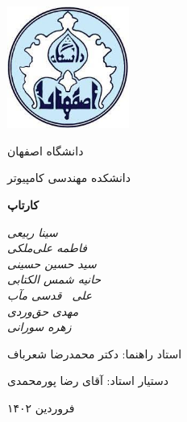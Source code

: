 \documentclass[12pt, oneside]{book}
\begin{document}
    \begin{titlepage}
    	\centering
    	\includegraphics[width=4cm, height=4cm]{logo}\par
        \vspace{2mm}
    	دانشگاه اصفهان \par
        دانشکده مهندسی کامپیوتر \par

    	\vspace{1cm}
    	{\huge \textbf{کارتاپ}\par}
    	\vspace{3cm}
    	{\small\itshape
        سینا ربیعی \\
    	فاطمه علی‌ملکی \\
    	سید حسین حسینی \\
    	حانیه شمس الکتابی \\
    	علی 
    	$\ $
    	قدسی مآب \\
    	مهدی حق‌وردی \\
    	زهره سورانی \par}

    	\vfill
        استاد راهنما:‌ دکتر محمدرضا شعرباف \par
        دستیار استاد:‌ آقای رضا پورمحمدی
    	\vfill

    	{\large فروردین ۱۴۰۲\par}
    \end{titlepage}
\end{document}
